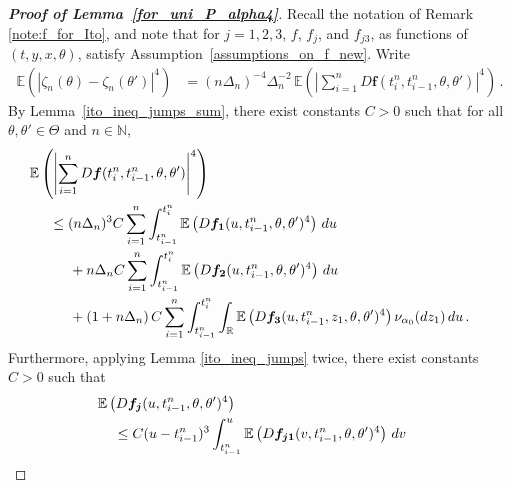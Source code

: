 \documentclass[11pt,a4paper]{article}
\newcommand{\alphan}{{\alpha_0}}
\newcommand{\tminus}{{t_{i-1}^n}}
\newcommand{\tplus}{{t_i^n}}
\newcommand{\EE}{{\mathbb E}}
\newcommand{\RR}{{\mathbb R}}
\newcommand{\NN}{{\mathbb N}}
\numberwithin{equation}{section}
\numberwithin{theorem}{section}
\begin{document}
\begin{proof}[\textbf{Proof of Lemma~\ref{for_uni_P_alpha4}}]
Recall the notation of Remark
\ref{note:f_for_Ito}, and note that for $j=1,2,3$, $f$, $f_j$, and $f_{j3}$, as functions of $(t,y,x,\theta)$,
  satisfy Assumption~\ref{assumptions_on_f_new}. Write
\begin{align}
\EE\left( |\zeta_n(\theta)-\zeta_n(\theta')|^4\right) &=
                                                                     (n\Delta_n)^{-4}\Delta_n^{-2}
                                                                     \,\EE\left(\left|\sum_{i=1}^n
                                                                     D
                                                                     \bm{f}(\tplus,\tminus, \theta,
                                                                     \theta')\right|^4\right)\,.
\label{general_desired_result_alpha4}
\end{align}
%
By Lemma~\ref{ito_ineq_jumps_sum}, there exist constants
$C>0$  such that for all $\theta,\theta' \in \Theta$ and $n\in\NN$,
\begin{align}
\begin{split}
&\hspace{-5mm} \EE\left( \left| \sum_{i=1}^n D\bm{f}(\tplus, \tminus,\theta,\theta') \right|^4\right)\label{general_first_step_alpha4}\\
&\leq  (n\Delta_n)^{3} C\sum_{i=1}^n\int_\tminus^\tplus
  \EE\left( D\bm{f_1}(u, \tminus, \theta,\theta')^4\right) \, du \\
&\hspace{5mm} + n\Delta_n C \sum_{i=1}^n
 \int_\tminus^\tplus  \EE\left(
D\bm{f_2}(u,\tminus, \theta,\theta')^4\right)\, du \\
&\hspace{5mm} + \left( 1 + n\Delta_n\right)
 C \sum_{i=1}^n \int_\tminus^\tplus \int_\RR  \EE\left(
    D\bm{f_3}(u,\tminus,z_1, \theta,\theta')^{4}\right)
  \nu_\alphan(dz_1)\, du \,.
\end{split}
\end{align}
%
Furthermore,
applying Lemma
\ref{ito_ineq_jumps} twice, there exist constants $C>0$ such that
\begin{align}
\begin{split}
\label{first_part_alpha4}
&\hspace{-4mm} \EE\left( D\bm{f_j}(u ,\tminus,
  \theta,\theta')^4\right)  \\
&\leq C({u}-\tminus)^3\int_\tminus^{u}\EE\left( D\bm{f_{j1}}({v},\tminus,
  \theta,\theta')^4\right)\, d{v} \\

\end{split}
\end{align}
\end{proof}
\end{document}
